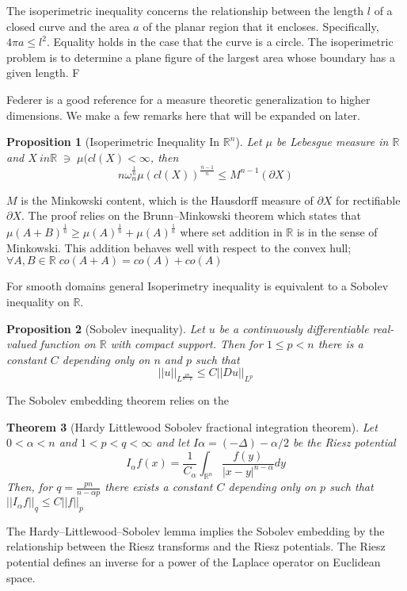 \documentclass[a4paper]{article}
\theoremstyle{plain}
\newtheorem{thm}{Theorem}[section]
\newtheorem{prop}[thm]{Proposition}
\theoremstyle{definition}
\theoremstyle{remark}
\newcommand{\st}{\; \ni \;}
\numberwithin{equation}{section}
\begin{document}
The isoperimetric inequality concerns the relationship between the length $l$ of a closed curve and the area $a$ of the planar region that it encloses.  Specifically, $4 \pi a \leq l^2$.  Equality holds in the case that the curve is a circle. The isoperimetric problem is to determine a plane figure of the largest area whose boundary has a given length. F

Federer \cite{federer1996geometric} is a good reference for a measure theoretic generalization to higher dimensions. We make a few remarks here that will be expanded on later.
\begin{prop}[Isoperimetric Inequality In $\mathbb{R}^n$]
Let $\mu$ be Lebesgue measure in $\mathbb{R}$ and $X \ in \mathbb{R} \st \mu(cl(X) < \infty$, then
\begin{equation*}
  n \omega^{\frac{1}{n}}_{n} \mu(cl(X))^{\frac{n-1}{n}} \leq M^{n-1}(\partial X)
\end{equation*}
\end{prop}
$M$ is the Minkowski content, which is  the Hausdorff measure of $\partial X$ for rectifiable $\partial X$.
The proof relies on the Brunn–Minkowski theorem which states that $\mu(A+B)^{\frac{1}{n}} \geq \mu(A)^{\frac{1}{n}} + \mu(A)^{\frac{1}{n}}$ where set addition in $\mathbb{R}$ is in the sense of Minkowski.  This addition behaves well with respect to the convex hull; $\forall A,B \in \mathbb{R} \; co(A + A) = co(A) + co(A)$

For smooth domains general Isoperimetry inequality is equivalent to a Sobolev inequality on $\mathbb{R}$.

\begin{prop}[Sobolev inequality]
Let $u$ be a continuously differentiable real-valued function on $\mathbb{R}$ with compact support. Then for $1 ≤ p < n$ there is a constant $C$ depending only on $n$ and $p$ such that
\begin{equation*}
  ||u||_{L^{\frac{pn}{n-p}}} \leq C || Du||_{L^p}
\end{equation*}
\end{prop}

The Sobolev embedding theorem relies on the
\begin{thm}[Hardy Littlewood Sobolev fractional integration theorem]
Let $0 < \alpha <n$ and $1 < p  < q < \infty$ and let $I\alpha = (−\Delta)−\alpha/2$ be the Riesz potential
\begin{equation*}
  I_\alpha f(x) = \frac{1}{C_\alpha}\int_{\mathbb{R}^n} \frac{f(y)}{|x-y|^{n-\alpha}} dy
\end{equation*}
Then, for $q=\frac{pn}{n-\alpha p}$
there exists a constant $C$ depending only on $p$ such that $||I_\alpha f||_q \leq C ||f||_p$
\end{thm}
The Hardy–Littlewood–Sobolev lemma implies the Sobolev embedding by the relationship between the Riesz transforms and the Riesz potentials.  The Riesz potential defines an inverse for a power of the Laplace operator on Euclidean space.
\end{document}
